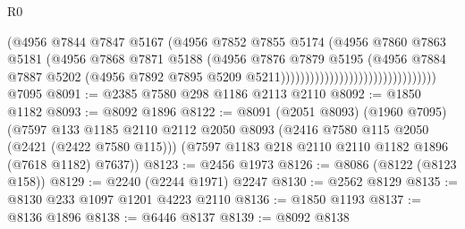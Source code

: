 \begin{lexlean}{R0}
\begin{coremodule}
                                                      (@4956
                                                        @7844
                                                        @7847
                                                        @5167
                                                        (@4956
                                                          @7852
                                                          @7855
                                                          @5174
                                                          (@4956
                                                            @7860
                                                            @7863
                                                            @5181
                                                            (@4956
                                                              @7868
                                                              @7871
                                                              @5188
                                                              (@4956
                                                                @7876
                                                                @7879
                                                                @5195
                                                                (@4956
                                                                  @7884
                                                                  @7887
                                                                  @5202
                                                                  (@4956
                                                                    @7892
                                                                    @7895
                                                                    @5209
                                                                    @5211))))))))))))))))))))))))))))))))
    @7095
@8091 := @2385 @7580 @298 @1186 @2113 @2110
@8092 := @1850 @1182
@8093 := @8092 @1896
@8122 := @8091
    (@2051 @8093)
    (@1960 @7095)
    (@7597
      @133
      @1185
      @2110
      @2112
      @2050
      @8093
      (@2416 @7580 @115 @2050 (@2421 (@2422 @7580 @115)))
      (@7597 @1183 @218 @2110 @2110 @1182 @1896 (@7618 @1182) @7637))
@8123 := @2456 @1973
@8126 := @8086 (@8122 (@8123 @158))
@8129 := @2240 (@2244 @1971) @2247
@8130 := @2562 @8129
@8135 := @8130 @233 @1097 @1201 @4223 @2110
@8136 := @1850 @1193
@8137 := @8136 @1896
@8138 := @6446 @8137
@8139 := @8092 @8138

\end{coremodule}
\end{lexlean}
